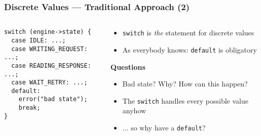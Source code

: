 \begin{frame}[fragile]
  \frametitle{Discrete Values --- Traditional Approach (2)}

  \begin{columns}[t]

    \begin{column}{.5\textwidth}

      \begin{block}{}
\begin{verbatim}
switch (engine->state) {
  case IDLE: ...;
  case WRITING_REQUEST: ...;
  case READING_RESPONSE: ...;
  case WAIT_RETRY: ...;
  default:
    error("bad state");
    break;
}
\end{verbatim}
      \end{block}

    \end{column}

    \begin{column}{.4\textwidth}

      \begin{itemize}
      \item \texttt{switch} is \textit{the} statement for discrete
        values
      \item As everybody knows: \texttt{default} is obligatory
      \end{itemize}

      \textbf{Questions}

      \begin{itemize}
      \item Bad state? Why? How can this happen?
      \item The \texttt{switch} handles every possible value anyhow
      \item ... so why have a \texttt{default}?
      \end{itemize}

    \end{column}

  \end{columns}

\end{frame}

